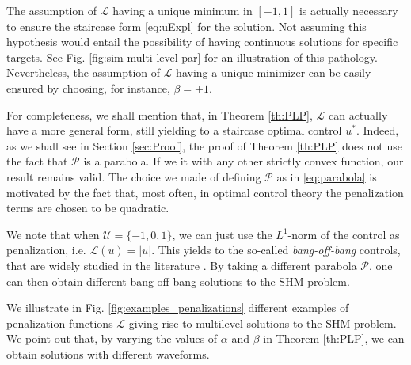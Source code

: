 \documentclass[twocolumn]{autart}    %
\begin{document}
The assumption of $\mathcal{L}$ having a unique minimum in $[-1,1]$ is actually necessary to ensure the staircase form \eqref{eq:uExpl} for the solution. Not assuming this hypothesis would entail the possibility of having continuous solutions for specific targets. See Fig. \ref{fig:sim-multi-level-par} for an illustration of this pathology. Nevertheless, the assumption of $\mathcal{L}$ having a unique minimizer can be easily ensured by choosing, for instance, $\beta=\pm 1$.

\vspace{0.5em}
\begin{remark}
For completeness, we shall mention that, in Theorem \ref{th:PLP}, $\mathcal L$ can actually have a more general form, still yielding to a staircase optimal control $u^\ast$. Indeed, as we shall see in Section \ref{sec:Proof}, the proof of Theorem \ref{th:PLP} does not use the fact that $\mathcal P$ is a parabola. If we it with any other strictly convex function, our result remains valid. The choice we made of defining $\mathcal P$ as in \eqref{eq:parabola} is motivated by the fact that, most often, in optimal control theory the penalization terms are chosen to be quadratic.
\end{remark}

\vspace{0.5em}
\begin{remark}
	We note that when  $\mathcal{U}= \{-1,0,1\}$, we can just use the $L^1$-norm of the control as penalization, i.e. $\mathcal{L}(u) = |u|$. This yields to the so-called \emph{bang-off-bang} controls, that are widely studied in the literature \cite{nagahara2013maximum,ikeda2016maximum}. By taking a different parabola $\mathcal{P}$, one can then obtain different bang-off-bang solutions to the SHM problem.
\end{remark}

We illustrate in Fig. \ref{fig:examples_penalizations} different examples of penalization functions $\mathcal{L}$ giving rise to multilevel solutions to the SHM problem. We point out that, by varying the values of $\alpha$ and $\beta$ in Theorem \ref{th:PLP}, we can obtain solutions with different waveforms.
\end{document}
